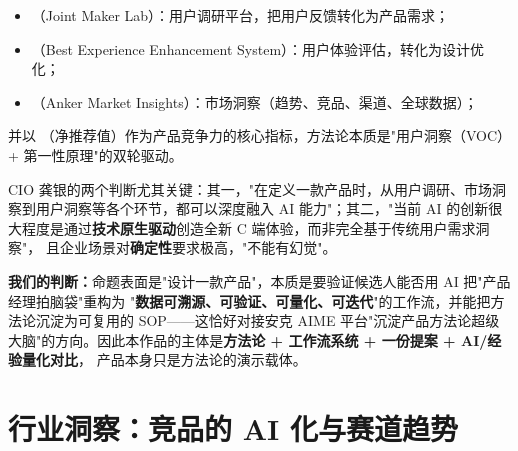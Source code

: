\begin{itemize}
\item {}（Joint Maker Lab）：用户调研平台，把用户反馈转化为产品需求；
\item {}（Best Experience Enhancement System）：用户体验评估，转化为设计优化；
\item {}（Anker Market Insights）：市场洞察（趋势、竞品、渠道、全球数据）；
\end{itemize}
并以 （净推荐值）作为产品竞争力的核心指标，方法论本质是"用户洞察（VOC）+ 第一性原理"的双轮驱动。

CIO 龚银的两个判断尤其关键：其一，"在定义一款产品时，从用户调研、市场洞察到用户洞察等各个环节，都可以深度融入
AI 能力"；其二，"当前 AI 的创新很大程度是通过\textbf{技术原生驱动}创造全新 C 端体验，而非完全基于传统用户需求洞察"，
且企业场景对\textbf{确定性}要求极高，"不能有幻觉"。

\begin{center}
\end{center}

\textbf{我们的判断：}命题表面是"设计一款产品"，本质是要验证候选人能否用 AI 把"产品经理拍脑袋"重构为
"\textbf{数据可溯源、可验证、可量化、可迭代}"的工作流，并能把方法论沉淀为可复用的 SOP——这恰好对接安克 AIME
平台"沉淀产品方法论超级大脑"的方向。因此本作品的主体是\textbf{方法论 + 工作流系统 + 一份提案 + AI/经验量化对比}，
产品本身只是方法论的演示载体。

\section{行业洞察：竞品的 AI 化与赛道趋势}

